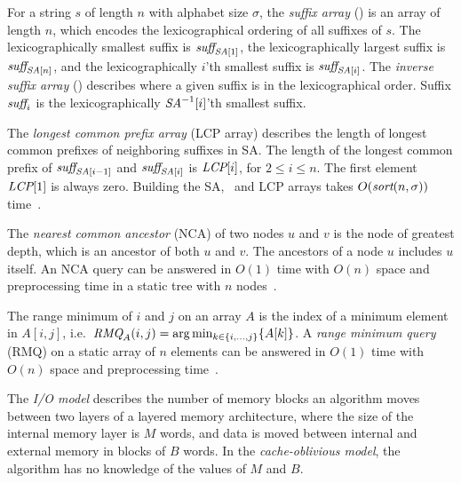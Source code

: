 \documentclass[a4]{article}
\begin{document}
For a string $s$ of length $n$ with alphabet size $\sigma$, the \emph{suffix array} (\SA) is an array of length $n$, which encodes the lexicographical ordering of all suffixes of $s$. The lexicographically smallest suffix is $\textit{suff}_{\textit{SA}[1]}$, the lexicographically largest suffix is $\textit{suff}_{\textit{SA}[n]}$, and the lexicographically $i$'th smallest suffix is $\textit{suff}_{\textit{SA}[i]}$. The \emph{inverse suffix array} (\SAi) describes where a given suffix is in the lexicographical order. Suffix $\textit{suff}_i$ is the lexicographically $\textit{SA}^{-1}[i]$'th smallest suffix.

The \emph{longest common prefix array} (LCP array) describes the length of longest common prefixes of neighboring suffixes in SA. The length of the longest common prefix of $\textit{suff}_{\textit{SA}[i-1]}$ and $\textit{suff}_{\textit{SA}[i]}$ is $\textit{LCP}[i]$, for $2 \leq i \leq n$. The first element $\textit{LCP}[1]$ is always zero.
Building the SA, \SAi\ and LCP arrays takes $O(\textit{sort}(n,\sigma))$ time~\cite{sort-complexity}.

The \emph{nearest common ancestor} (NCA) of two nodes $u$ and $v$ is the node of greatest depth, which is an ancestor of both $u$ and $v$. The ancestors of a node $u$ includes $u$ itself. An NCA query can be answered in $O(1)$ time with $O(n)$ space and preprocessing time in a static tree with $n$ nodes~\cite{nca}.

The range minimum of $i$ and $j$ on an array $A$ is the index of a minimum element in $A[i,j]$, i.e.\ $\textit{RMQ}_A(i,j) = \arg \min_{k\in\{i,...,j\}}\{A[k]\}$. A \emph{range minimum query} (RMQ) on a static array of $n$ elements can be answered in $O(1)$ time with $O(n)$ space and preprocessing time~\cite{jf-rmq}.

The \emph{I/O model} describes the number of memory blocks an algorithm moves between two layers of a layered memory architecture, where the size of the internal memory layer is $M$ words, and data is moved between internal and external memory in blocks of $B$ words. In the \emph{cache-oblivious model}, the algorithm has no knowledge of the values of $M$ and $B$.
\end{document}
